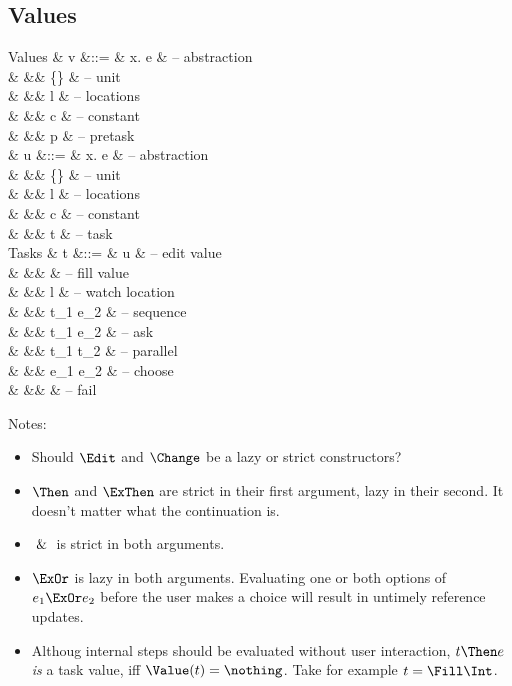 \subsection{Values}

\begin{grammar}
  Values
    & v      &::= & \lambda x. e                & – abstraction \\
    &        &\mid& \{\}                        & – unit \\
    &        &\mid& l                           & – locations \\
    &        &\mid& c                           & – constant \\
    &        &\mid& p                           & – pretask \\
    & u      &::= & \lambda x. e                & – abstraction \\
    &        &\mid& \{\}                        & – unit \\
    &        &\mid& l                           & – locations \\
    &        &\mid& c                           & – constant \\
    &        &\mid& t                           & – task \\
  Tasks
    & t      &::= & \Edit u                     & – edit value \\
    &        &\mid& \Fill \beta                 & – fill value \\
    &        &\mid& \Change l                    & – watch location \\
    &        &\mid& t_1 \Then e_2               & – sequence\footnotemark \\
    &        &\mid& t_1 \ExThen e_2               & – ask \\
    &        &\mid& t_1 \And t_2                & – parallel \\
    &        &\mid& e_1 \ExOr e_2                 & – choose \\
    &        &\mid& \Fail                       & – fail \\
\end{grammar}

Notes:
\begin{itemize}
  \item Should $\Edit$ and $\Change$ be a lazy or strict constructors?
  \item $\Then$ and $\ExThen$ are strict in their first argument, lazy in their second.
    It doesn't matter what the continuation is.
  \item $\And$ is strict in both arguments.
  \item $\ExOr$ is lazy in both arguments.
    Evaluating one or both options of $e_1 \ExOr e_2$ before the user makes a choice will result in untimely reference updates.
  \item Althoug internal steps should be evaluated without user interaction,
    $t \Then e$ \emph{is} a task value, iff $\Value(t) = \nothing$.
    Take for example $t = \Fill \Int$.
\end{itemize}


